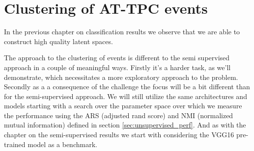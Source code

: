 \chapter{Clustering of AT-TPC events}\label{chap:clustering}

In the previous chapter on classification results we observe that we are able to construct high quality latent spaces.  

The approach to the clustering of events is different to the semi supervised approach in a couple of meaningful ways. Firstly it's a harder task, as we'll demonstrate, which necessitates a more exploratory approach to the problem. Secondly as a a consequence of the challenge the focus will be a bit different than for the semi-supervised approach. We will still utilize the same architectures and models starting with a search over the parameter space over which we measure the performance using the ARS (adjusted rand score) and NMI (normalized mutual information) defined in section \ref{sec:unsupervised_perf}. And as with the chapter on the semi-supervised results we start with considering the VGG16 pre-trained model as a benchmark. 